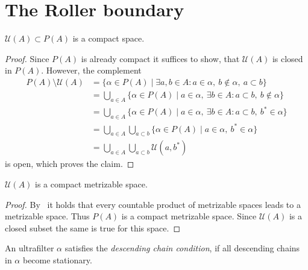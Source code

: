 \section{The Roller boundary}
\label{sec:roller}

\begin{prop}
  \(\mathcal{U}(A) \subset P(A)\) is a compact space.
\end{prop}

\begin{proof}
  Since \(P(A)\) is already compact it suffices to show, that \(\mathcal{U}(A)\) is closed in \(P(A)\). However, the complement
  \begin{align*}
    P(A) \setminus \mathcal{U}(A)
    & = \{\alpha \in P(A) \mid \exists a, b \in A\colon a \in \alpha,\ b \notin \alpha,\ a \subset b\}\\
    & = \bigcup_{a \in A} \{\alpha \in P(A) \mid a \in \alpha,\ \exists b \in A\colon a \subset b,\ b \notin \alpha\}\\
    & = \bigcup_{a \in A} \{\alpha \in P(A) \mid a \in \alpha,\ \exists b \in A\colon a \subset b,\ b^\ast \in \alpha\}\\
    & = \bigcup_{a \in A} \bigcup_{a \subset b}\{\alpha \in P(A) \mid a \in \alpha,\ b^\ast \in \alpha\}\\
    & = \bigcup_{a \in A} \bigcup_{a \subset b}\mathcal{U}(a, b^\ast)
  \end{align*}
  is open, which proves the claim.
\end{proof}

\begin{cor}
  \label{cor:comp-met}
  \(\mathcal{U}(A)\) is a compact metrizable space.
\end{cor}

\begin{proof}
  By~\textcite[Thm.\ 4.2.2]{Engelking} it holds that every countable product of metrizable spaces leads to a metrizable space. Thus \(P(A)\) is a compact metrizable space. Since \(\mathcal{U}(A)\) is a closed subset the same is true for this space.
\end{proof}

\begin{defin}
  An ultrafilter \(\alpha\) satisfies the \emph{descending chain condition}, if all descending chains in \(\alpha\) become stationary.
\end{defin}

